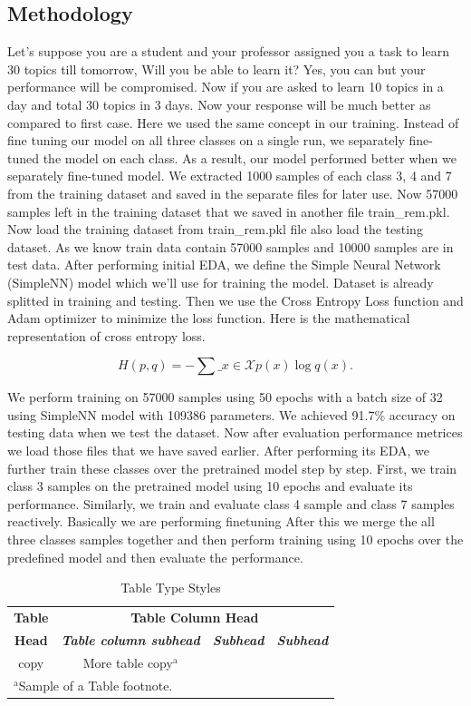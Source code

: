 \documentclass[conference]{IEEEtran}
\begin{document}
\subsection{Methodology}
Let’s suppose you are a student and your professor assigned you a task to learn 30 topics till tomorrow, Will you be able to learn it? Yes, you can but your performance will be compromised. Now if you are asked to learn 10 topics in a day and total 30 topics in 3 days. Now your response will be much better as compared to first case. Here we used the same concept in our training. Instead of fine tuning our model on all three classes on a single run, we separately fine-tuned the model on each class. As a result, our model performed better when we separately fine-tuned model. 
We extracted 1000 samples of each class 3, 4 and 7 from the training dataset and saved in the separate files for later use. Now 57000 samples left in the training dataset that we saved in another file train\_rem.pkl. Now load the training dataset from train\_rem.pkl file also load the testing dataset. As we know train data contain 57000 samples and 10000 samples are in test data. After performing initial EDA, we define the Simple Neural Network (SimpleNN) model which we’ll use for training the model. Dataset is already splitted in training and testing. Then we use the Cross Entropy Loss function and Adam optimizer to minimize the loss function. Here is the mathematical representation of cross entropy loss.

\begin{equation}
H(p, q) = - \sum\_{x \in \mathcal{X}} p(x) \log q(x).
\end{equation}

We perform training on 57000 samples using 50 epochs with a batch size of 32 using SimpleNN model with 109386 parameters. We achieved 91.7\% accuracy on testing data when we test the dataset. Now after evaluation performance metrices we load those files that we have saved earlier. After performing its EDA, we further train these classes over the pretrained model step by step. First, we train class 3 samples on the pretrained model using 10 epochs and evaluate its performance. Similarly, we train and evaluate class 4 sample and class 7 samples reactively. Basically we are performing finetuning
After this we merge the all three classes samples together and then perform training using 10 epochs over the predefined model and then evaluate the performance.

\begin{table}[htbp]
\caption{Table Type Styles}
\begin{center}
\begin{tabular}{|c|c|c|c|}
\hline
\textbf{Table}&\multicolumn{3}{|c|}{\textbf{Table Column Head}} \\
\cline{2-4} 
\textbf{Head} & \textbf{\textit{Table column subhead}}& \textbf{\textit{Subhead}}& \textbf{\textit{Subhead}} \\
\hline
copy& More table copy$^{\mathrm{a}}$& &  \\
\hline
\multicolumn{4}{l}{$^{\mathrm{a}}$Sample of a Table footnote.}
\end{tabular}
\label{tab1}
\end{center}
\end{table}
\end{document}
